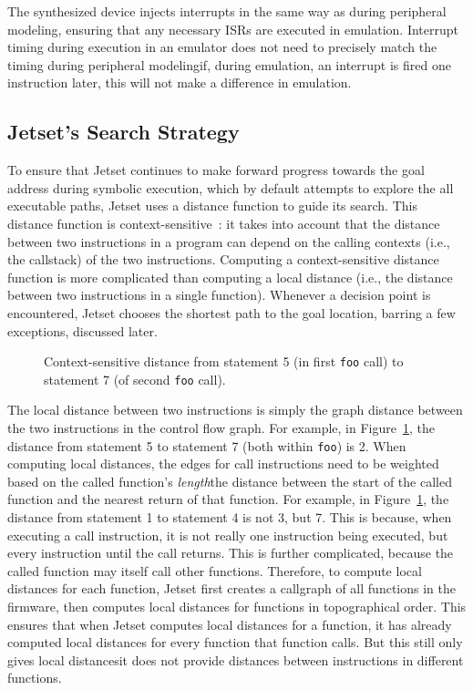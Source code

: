 The synthesized device injects interrupts in the same way as during peripheral modeling, ensuring that any necessary ISRs are executed in emulation.
Interrupt timing during execution in an emulator does not need to precisely match the timing during peripheral modeling\textemdash if, during emulation, an interrupt is fired one instruction later, this will not make a difference in emulation.

\subsection{Jetset's Search Strategy}

To ensure that Jetset continues to make forward progress towards the goal address during symbolic execution, which by default attempts to explore the all executable paths, Jetset uses a distance function to guide its search.
This distance function is context-sensitive~\cite{directedsymex}: it takes into account that the distance between two instructions in a program can depend on the calling contexts (i.e., the callstack) of the two instructions.
Computing a context-sensitive distance function is more complicated than computing a local distance (i.e., the distance between two instructions in a single function).
Whenever a decision point is encountered, Jetset chooses the shortest path to the goal location, barring a few exceptions, discussed later.

\begin{figure}
\centering

\caption{Context-sensitive distance from statement 5 (in first \texttt{foo} call) to statement 7 (of second \texttt{foo} call).}
\label{fig:jetset-distance-func}
\end{figure}

The local distance between two instructions is simply the graph distance between the two instructions in the control flow graph.
For example, in Figure~\ref{fig:jetset-distance-func}, the distance from statement 5 to statement 7 (both within \texttt{foo}) is 2.
When computing local distances, the edges for call instructions need to be weighted based on the called function's \textit{length}\textemdash the distance between the start of the called function and the nearest return of that function.
For example, in Figure~\ref{fig:jetset-distance-func}, the distance from statement 1 to statement 4 is not 3, but 7.
This is because, when executing a call instruction, it is not really one instruction being executed, but every instruction until the call returns.
This is further complicated, because the called function may itself call other functions.
Therefore, to compute local distances for each function, Jetset first creates a callgraph of all functions in the firmware, then computes local distances for functions in topographical order.
This ensures that when Jetset computes local distances for a function, it has already computed local distances for every function that function calls.
But this still only gives local distances\textemdash it does not provide distances between instructions in different functions.

